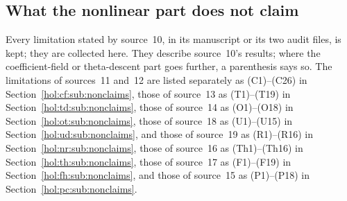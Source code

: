 \documentclass[11pt]{article}
\numberwithin{equation}{section}
\theoremstyle{definition}
\theoremstyle{remark}
\begin{document}
\subsection{What the nonlinear part does not claim}
\label{hol:nl:sub:nonclaims}

Every limitation stated by source~10, in its manuscript or its two audit
files, is kept; they are collected here. They describe source~10's results;
where the coefficient-field or theta-descent part goes further, a
parenthesis says so. The limitations of sources~11 and~12 are listed
separately as (C1)--(C26) in Section~\ref{hol:cf:sub:nonclaims}, those of
source~13 as (T1)--(T19) in Section~\ref{hol:td:sub:nonclaims}, those of
source~14 as (O1)--(O18) in Section~\ref{hol:ot:sub:nonclaims}, those of
source~18 as (U1)--(U15) in Section~\ref{hol:ud:sub:nonclaims}, and those of
source~19 as (R1)--(R16) in Section~\ref{hol:nr:sub:nonclaims}, those of
source~16 as (Th1)--(Th16) in Section~\ref{hol:th:sub:nonclaims}, those of
source~17 as (F1)--(F19) in Section~\ref{hol:fh:sub:nonclaims}, and those of
source~15 as (P1)--(P18) in Section~\ref{hol:pc:sub:nonclaims}.
\end{document}
